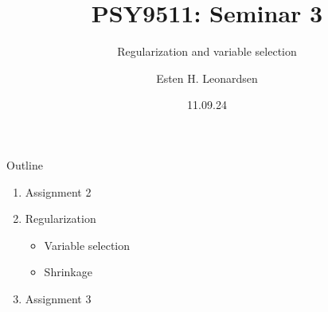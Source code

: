 \documentclass{beamer}
\title{PSY9511: Seminar 3}
\subtitle{Regularization and variable selection}
\author{Esten H. Leonardsen}
\date{11.09.24}
\begin{document}
	\begin{frame}
	 	\maketitle
	\end{frame}

    \begin{frame}{Outline}
        \centering
        \vfill
        \begin{enumerate}
            \item Assignment 2
            \item Regularization
            \begin{itemize}
                \item Variable selection
                \item Shrinkage
            \end{itemize}
            \item Assignment 3
        \end{enumerate}
        \vfill
    \end{frame}

    
    
    
\end{document}
